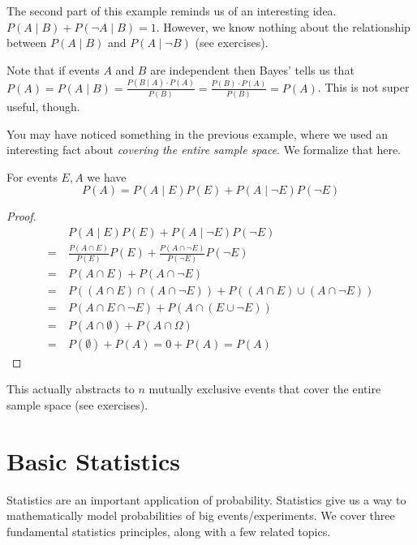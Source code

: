 \documentclass[main.tex]{subfiles}
\begin{document}
\begin{rem}
	The second part of this example reminds us of an interesting idea. \(P(A \mid B) + P(\lnot A \mid B) = 1\).
	However, we know nothing about the relationship between \(P(A \mid B)\) and \(P(A \mid \lnot B)\) (see exercises).
\end{rem}

Note that if events \(A\) and \(B\) are independent then Bayes' tells us that \(P(A) = P(A \mid B) = \frac{P(B \mid A) \cdot P(A)}{P(B)} = \frac{P(B) \cdot P(A)}{P(B)} = P(A)\).
This is not super useful, though.

You may have noticed something in the previous example, where we used an interesting fact about \textit{covering the entire sample space}.
We formalize that here.

\begin{prop}
	For events \(E,A\) we have
	\[P(A) = P(A \mid E)P(E) + P(A \mid \lnot E)P(\lnot E)\]
\end{prop}

\begin{proof}
	\begin{align*}
		   & P(A \mid E)P(E) + P(A \mid \lnot E)P(\lnot E) \\
		=\ & \frac{P(A \cap E)}{P(E)}P(E) + \frac{P(A \cap \lnot E)}{P(\lnot E)}P(\lnot E) \\
		=\ & P(A \cap E) + P(A \cap \lnot E) \\
		=\ & P((A \cap E) \cap (A \cap \lnot E)) + P((A \cap E) \cup (A \cap \lnot E)) \\
		=\ & P(A \cap E \cap \lnot E) + P(A \cap (E \cup \lnot E)) \\
		=\ & P(A \cap \emptyset) + P(A \cap \Omega) \\
		=\ & P(\emptyset) + P(A) = 0 + P(A) = P(A)
	\end{align*}
\end{proof}

\begin{rem}
	This actually abstracts to \(n\) mutually exclusive events that cover the entire sample space (see exercises).
\end{rem}

\section{Basic Statistics}

Statistics are an important application of probability. Statistics give us a way to mathematically model probabilities of big events/experiments. We cover three fundamental statistics principles, along with a few related topics.
\end{document}
